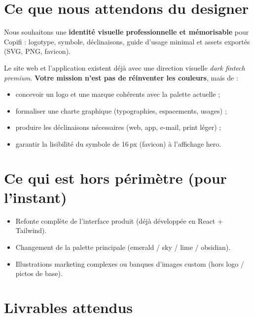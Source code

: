 \documentclass[11pt,a4paper]{report}
\begin{document}
\section{Ce que nous attendons du designer}

Nous souhaitons une \textbf{identité visuelle professionnelle et mémorisable} pour Copifi :
logotype, symbole, déclinaisons, guide d'usage minimal et assets exportés (SVG, PNG, favicon).

Le site web et l'application existent déjà avec une direction visuelle \emph{dark fintech premium}.
\textbf{Votre mission n'est pas de réinventer les couleurs}, mais de :
\begin{itemize}[leftmargin=*]
    \item concevoir un logo et une marque cohérents avec la palette actuelle ;
    \item formaliser une charte graphique (typographies, espacements, usages) ;
    \item produire les déclinaisons nécessaires (web, app, e-mail, print léger) ;
    \item garantir la lisibilité du symbole de 16\,px (favicon) à l'affichage hero.
\end{itemize}

\section{Ce qui est hors périmètre (pour l'instant)}

\begin{itemize}[leftmargin=*]
    \item Refonte complète de l'interface produit (déjà développée en React + Tailwind).
    \item Changement de la palette principale (emerald / sky / lime / obsidian).
    \item Illustrations marketing complexes ou banques d'images custom (hors logo / pictos de base).
\end{itemize}

\section{Livrables attendus}
\end{document}
